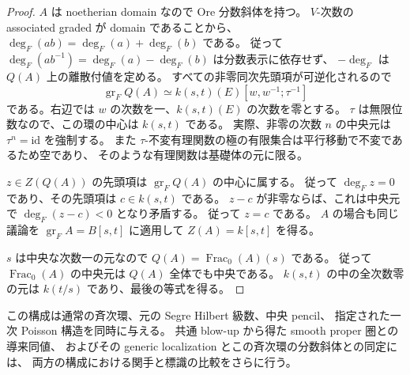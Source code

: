 \begin{proof}
$A$ は noetherian domain なので Ore 分数斜体を持つ。
$V$-次数の associated graded が domain であることから、
$\deg_F(ab)=\deg_F(a)+\deg_F(b)$ である。
従って $\deg_F(ab^{-1})=\deg_F(a)-\deg_F(b)$ は分数表示に依存せず、
$-\deg_F$ は $Q(A)$ 上の離散付値を定める。
すべての非零同次先頭項が可逆化されるので
\[
 \operatorname{gr}_F Q(A)
 \simeq k(s,t)(E)[w,w^{-1};\tau^{-1}]
\]
である。右辺では $w$ の次数を一、$k(s,t)(E)$ の次数を零とする。
$\tau$ は無限位数なので、この環の中心は $k(s,t)$ である。
実際、非零の次数 $n$ の中央元は $\tau^n=\mathrm{id}$ を強制する。
また $\tau$-不変有理関数の極の有限集合は平行移動で不変であるため空であり、
そのような有理関数は基礎体の元に限る。

$z\in Z(Q(A))$ の先頭項は $\operatorname{gr}_F Q(A)$ の中心に属する。
従って $\deg_Fz=0$ であり、その先頭項は $c\in k(s,t)$ である。
$z-c$ が非零ならば、これは中央元で $\deg_F(z-c)<0$ となり矛盾する。
従って $z=c$ である。
$A$ の場合も同じ議論を $\operatorname{gr}_FA=B[s,t]$ に適用して
$Z(A)=k[s,t]$ を得る。

$s$ は中央な次数一の元なので
$Q(A)=\operatorname{Frac}_0(A)(s)$ である。
従って $\operatorname{Frac}_0(A)$ の中央元は $Q(A)$ 全体でも中央である。
$k(s,t)$ の中の全次数零の元は $k(t/s)$ であり、最後の等式を得る。
\end{proof}

\begin{remark}\label{pencil:rem:scope}
この構成は通常の斉次環、元の Segre Hilbert 級数、中央 pencil、
指定された一次 Poisson 構造を同時に与える。
共通 blow-up から得た smooth proper 圏との導来同値、
およびその generic localization とこの斉次環の分数斜体との同定には、
両方の構成における関手と標識の比較をさらに行う。
\end{remark}
